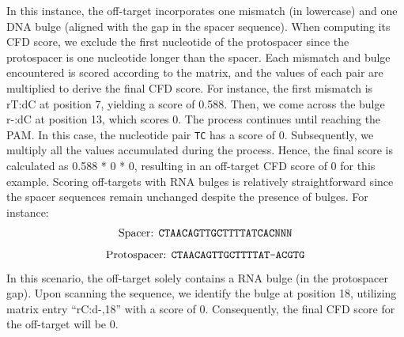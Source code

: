 \documentclass[a4paper, titlepage, openright]{book}
\begin{document}
In this instance, the off-target incorporates one mismatch (in lowercase) and one DNA bulge (aligned with the gap in the spacer sequence). When computing its CFD score, we exclude the first nucleotide of the protospacer since the protospacer is one nucleotide longer than the spacer. Each mismatch and bulge encountered is scored according to the matrix, and the values of each pair are multiplied to derive the final CFD score. For instance, the first mismatch is rT:dC at position 7, yielding a score of 0.588. Then, we come across the bulge r-:dC at position 13, which scores 0. The process continues until reaching the PAM. In this case, the nucleotide pair \texttt{TC} has a score of 0. Subsequently, we multiply all the values accumulated during the process. Hence, the final score is calculated as 0.588 * 0 * 0, resulting in an off-target CFD score of 0 for this example. Scoring off-targets with RNA bulges is relatively straightforward since the spacer sequences remain unchanged despite the presence of bulges. For instance: 
\[
    \text{Spacer: \texttt{CTAACAGTTGCTTTTATCACNNN}}
\] 
\[
    \text{Protospacer: \texttt{CTAACAGTTGCTTTTAT-ACGTG}}
\]
In this scenario, the off-target solely contains a RNA bulge (in the protospacer gap). Upon scanning the sequence, we identify the bulge at position 18, utilizing matrix entry “rC:d-,18” with a score of 0. Consequently, the final CFD score for the off-target will be 0.

\end{document}

